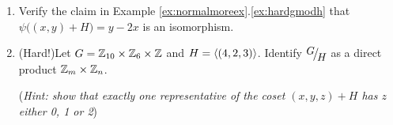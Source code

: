 \begin{exercises}
\begin{enumerate}
		
		\item Verify the claim in Example \ref*{ex:normalmoreex}.\ref{ex:hardgmodh} that $\psi\bigl((x,y)+H\bigr)=y-2x$ is an isomorphism.
		
		
		\item (Hard!)\lstsp Let $G=\mathbb{Z}_{10}\times\mathbb{Z}_6\times\mathbb{Z}$ and $H=\left\langle (4,2,3)\right\rangle$. Identify $\quotient GH$ as a direct product $\mathbb{Z}_m\times\mathbb{Z}_n$.\par
		(\emph{Hint: show that exactly one representative of the coset $(x,y,z)+H$ has $z$ either 0, 1 or 2})
		
		
	

\end{enumerate}
\end{exercises}
